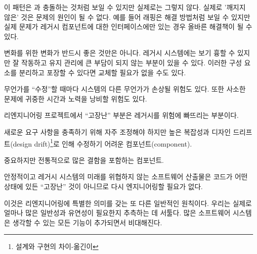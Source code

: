 \documentclass[a4paper,10pt,twoside]{book}
\begin{document}
이 패턴은 과 충돌하는 것처럼 보일 수 있지만 실제로는 그렇지 않다. 실제로 '깨지지 않은' 것은 문제의 원인이 될 수 없다. 예를 들어 래핑은 해결 방법처럼 보일 수 있지만 실제 문제가 레거시 컴포넌트에 대한 인터페이스에만 있는 경우 올바른 해결책이 될 수 있다.




\discussion
변화를 위한 변화가 반드시 좋은 것만은 아니다. 레거시 시스템에는 보기 흉할 수 있지만 잘 작동하고 유지 관리에 큰 부담이 되지 않는 부분이 있을 수 있다. 이러한 구성 요소를 분리하고 포장할 수 있다면 교체할 필요가 없을 수도 있다.

무언가를 ``수정''할 때마다 시스템의 다른 무언가가 손상될 위험도 있다. 또한 사소한 문제에 귀중한 시간과 노력을 낭비할 위험도 있다.

리엔지니어링 프로젝트에서 ``고장난'' 부분은 레거시를 위험에 빠뜨리는 부분이다.
\begin{bulletlist}
  \item 새로운 요구 사항을 충족하기 위해 자주 조정해야 하지만 높은 복잡성과 디자인 드리프트(design drift)\footnote{설계와 구현의 차이-옮긴이}로 인해 수정하기 어려운 컴포넌트(component).
  
  \item 중요하지만 전통적으로 많은 결함을 포함하는 컴포넌트.
\end{bulletlist}

안정적이고 레거시 시스템의 미래를 위협하지 않는 소프트웨어 산출물은 코드가 어떤 상태에 있든 ``고장난'' 것이 아니므로 다시 엔지니어링할 필요가 없다.




\discussion
이것은 리엔지니어링에 특별한 의미를 갖는 또 다른 일반적인 원칙이다. 우리는 실제로 얼마나 많은 일반성과 유연성이 필요한지 추측하는 데 서툴다. 많은 소프트웨어 시스템은 생각할 수 있는 모든 기능이 추가되면서 비대해진다.
\end{document}
